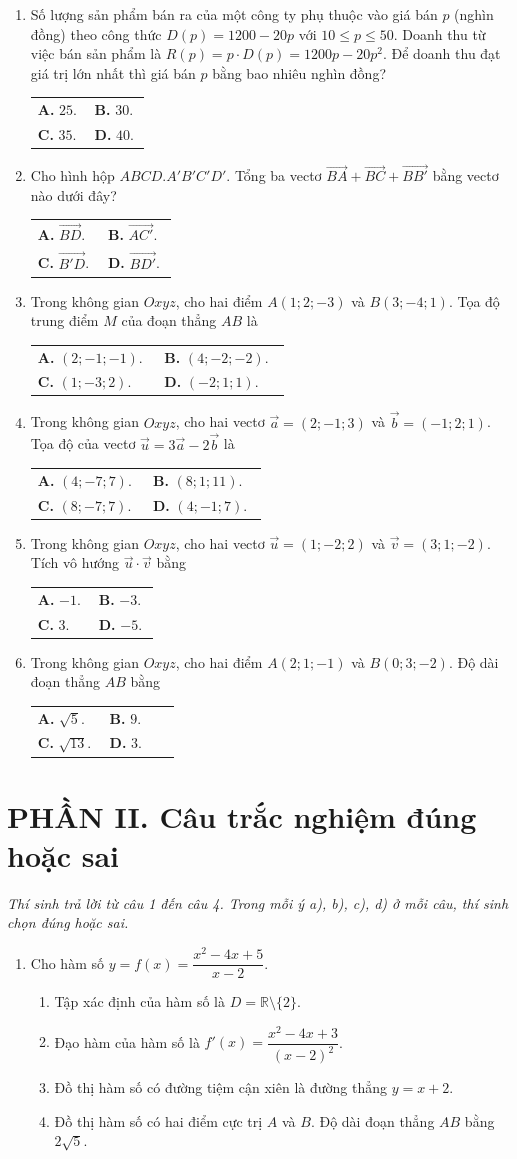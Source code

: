\documentclass[12pt,a4paper]{article}
\makeatletter
\newcommand{\bonpa}[4]{\par\nobreak\smallskip\nobreak\noindent
\begin{tabular}{@{}p{0.47\linewidth}p{0.47\linewidth}@{}}
\textbf{A.} #1 & \textbf{B.} #2\\[8pt]
\textbf{C.} #3 & \textbf{D.} #4\end{tabular}}
\makeatother
\begin{document}
\newpage
\begin{enumerate}[start=7]
\item Số lượng sản phẩm bán ra của một công ty phụ thuộc vào giá bán $p$ (nghìn đồng) theo công thức $D(p)=1200-20p$ với $10\le p\le 50$. Doanh thu từ việc bán sản phẩm là $R(p)=p\cdot D(p)=1200p-20p^2$. Để doanh thu đạt giá trị lớn nhất thì giá bán $p$ bằng bao nhiêu nghìn đồng?
\bonpa{$25$.}{$30$.}{$35$.}{$40$.}

\item Cho hình hộp $ABCD.A'B'C'D'$. Tổng ba vectơ $\vec{BA}+\vec{BC}+\vec{BB'}$ bằng vectơ nào dưới đây?
\bonpa{$\vec{BD}$.}{$\vec{AC'}$.}{$\vec{B'D}$.}{$\vec{BD'}$.}

\item Trong không gian $Oxyz$, cho hai điểm $A(1;2;-3)$ và $B(3;-4;1)$. Tọa độ trung điểm $M$ của đoạn thẳng $AB$ là
\bonpa{$(2;-1;-1)$.}{$(4;-2;-2)$.}{$(1;-3;2)$.}{$(-2;1;1)$.}

\item Trong không gian $Oxyz$, cho hai vectơ $\vec{a}=(2;-1;3)$ và $\vec{b}=(-1;2;1)$. Tọa độ của vectơ $\vec{u}=3\vec{a}-2\vec{b}$ là
\bonpa{$(4;-7;7)$.}{$(8;1;11)$.}{$(8;-7;7)$.}{$(4;-1;7)$.}

\item Trong không gian $Oxyz$, cho hai vectơ $\vec{u}=(1;-2;2)$ và $\vec{v}=(3;1;-2)$. Tích vô hướng $\vec{u}\cdot\vec{v}$ bằng
\bonpa{$-1$.}{$-3$.}{$3$.}{$-5$.}

\item Trong không gian $Oxyz$, cho hai điểm $A(2;1;-1)$ và $B(0;3;-2)$. Độ dài đoạn thẳng $AB$ bằng
\bonpa{$\sqrt{5}$.}{$9$.}{$\sqrt{13}$.}{$3$.}
\end{enumerate}

\vspace{3pt}
\section*{\large PHẦN II. Câu trắc nghiệm đúng hoặc sai}
\textit{Thí sinh trả lời từ câu 1 đến câu 4. Trong mỗi ý a), b), c), d) ở mỗi câu, thí sinh chọn đúng hoặc sai.}
\begin{enumerate}
\item Cho hàm số $y=f(x)=\dfrac{x^2-4x+5}{x-2}$.
\begin{enumerate}
\item Tập xác định của hàm số là $D=\mathbb{R}\setminus\{2\}$.
\item Đạo hàm của hàm số là $f'(x)=\dfrac{x^2-4x+3}{(x-2)^2}$.
\item Đồ thị hàm số có đường tiệm cận xiên là đường thẳng $y=x+2$.
\item Đồ thị hàm số có hai điểm cực trị $A$ và $B$. Độ dài đoạn thẳng $AB$ bằng $2\sqrt{5}$.
\end{enumerate}
\end{enumerate}
\end{document}
